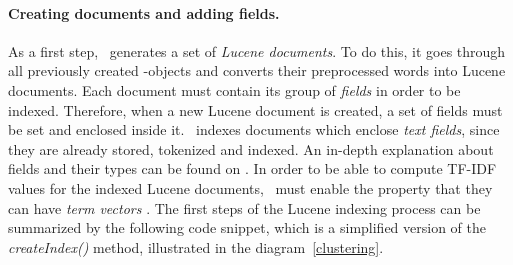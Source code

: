 \paragraph{Creating documents and adding fields.}
As a first step, \toolname\ generates a set of \textit{Lucene documents}. 
To do this, it goes through all previously created \Crash-objects and converts their preprocessed words into Lucene documents. 
Each document must contain its group of \textit{fields} in order to be indexed.
Therefore, when a new Lucene document is created, a set of fields 
must be set and enclosed inside it. 
\toolname\ indexes documents which enclose \textit{text fields}, since they are already stored, tokenized and indexed. 
An in-depth explanation about fields and their types can be found on \cite{lucenefield,lucenetextfield}. 
In order to be able to compute TF-IDF values for the indexed Lucene documents, \toolname\ must enable the property that they can have \textit{term vectors} \cite{lucenetermvector}.
The first steps of the Lucene indexing process can be summarized by the following code snippet, which is a simplified version of the \textit{createIndex()} method, illustrated in the diagram~\ref{clustering}.

